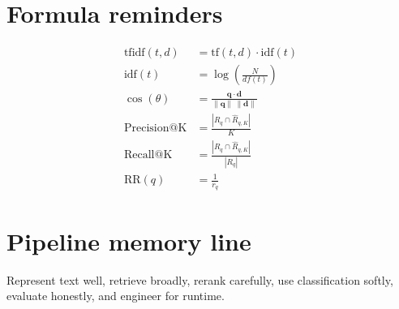 \documentclass[11pt,oneside]{report}
\newcommand{\vect}[1]{\mathbf{#1}}
\begin{document}
\section*{Formula reminders}
\begin{align*}
\mathrm{tfidf}(t,d) &= \mathrm{tf}(t,d)\cdot \mathrm{idf}(t) \\
\mathrm{idf}(t) &= \log\!\left(\frac{N}{df(t)}\right) \\
\cos(\theta) &= \frac{\vect{q}\cdot\vect{d}}{\|\vect{q}\|\,\|\vect{d}\|} \\
\mathrm{Precision@K} &= \frac{|R_q\cap \hat{R}_{q,K}|}{K} \\
\mathrm{Recall@K} &= \frac{|R_q\cap \hat{R}_{q,K}|}{|R_q|} \\
\mathrm{RR}(q) &= \frac{1}{r_q}
\end{align*}

\section*{Pipeline memory line}
\begin{rememberbox}
Represent text well, retrieve broadly, rerank carefully, use classification softly, evaluate honestly, and engineer for runtime.
\end{rememberbox}
\end{document}
